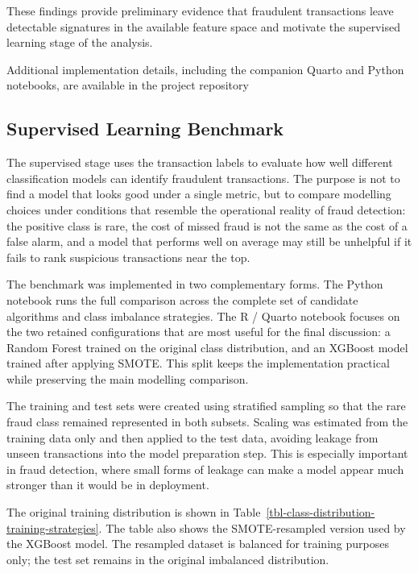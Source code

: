 \documentclass[
  12pt,
  letterpaper,
]{book}
\begin{document}
These findings provide preliminary evidence that fraudulent transactions
leave detectable signatures in the available feature space and motivate
the supervised learning stage of the analysis.

Additional implementation details, including the companion Quarto and
Python notebooks, are available in the project repository
\href{https://github.com/rodrigokang/portfolio/tree/main/notebooks-and-scripts/2-retail-analytics/1-credit-card-fraud-detection-ml-benchmark}{\faGithub}

\subsection{Supervised Learning
Benchmark}\label{supervised-learning-benchmark}

The supervised stage uses the transaction labels to evaluate how well
different classification models can identify fraudulent transactions.
The purpose is not to find a model that looks good under a single
metric, but to compare modelling choices under conditions that resemble
the operational reality of fraud detection: the positive class is rare,
the cost of missed fraud is not the same as the cost of a false alarm,
and a model that performs well on average may still be unhelpful if it
fails to rank suspicious transactions near the top.

The benchmark was implemented in two complementary forms. The Python
notebook runs the full comparison across the complete set of candidate
algorithms and class imbalance strategies. The R / Quarto notebook
focuses on the two retained configurations that are most useful for the
final discussion: a Random Forest trained on the original class
distribution, and an XGBoost model trained after applying SMOTE. This
split keeps the implementation practical while preserving the main
modelling comparison.

The training and test sets were created using stratified sampling so
that the rare fraud class remained represented in both subsets. Scaling
was estimated from the training data only and then applied to the test
data, avoiding leakage from unseen transactions into the model
preparation step. This is especially important in fraud detection, where
small forms of leakage can make a model appear much stronger than it
would be in deployment.

The original training distribution is shown in
Table~\ref{tbl-class-distribution-training-strategies}. The table also
shows the SMOTE-resampled version used by the XGBoost model. The
resampled dataset is balanced for training purposes only; the test set
remains in the original imbalanced distribution.
\end{document}
